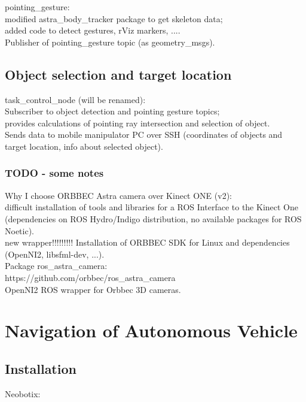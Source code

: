 pointing\_gesture:\\
modified astra\_body\_tracker package to get skeleton data;\\
added code to detect gestures, rViz markers, ....\\

Publisher of pointing\_gesture topic (as geometry\_msgs).\\


\subsection{Object selection and target location}
task\_control\_node (will be renamed):\\
Subscriber to object detection and pointing gesture topics;\\
provides calculations of pointing ray intersection and selection of object.\\
Sends data to mobile manipulator PC over SSH (coordinates of objects and target location, info about selected object).\\

\subsubsection{TODO - some notes}
Why I choose ORBBEC Astra camera over Kinect ONE (v2):\\
difficult installation of tools and libraries for a ROS Interface to the Kinect One (dependencies on ROS Hydro/Indigo distribution, no available packages for ROS Noetic).\\
new wrapper!!!!!!!!!
Installation of ORBBEC SDK for Linux and dependencies (OpenNI2, libsfml-dev, ...).\\

 Package ros\_astra\_camera:\\
 https://github.com/orbbec/ros\_astra\_camera\\
 OpenNI2 ROS wrapper for Orbbec 3D cameras.\\



\section{Navigation of Autonomous Vehicle}

\subsection{Installation}
Neobotix:

